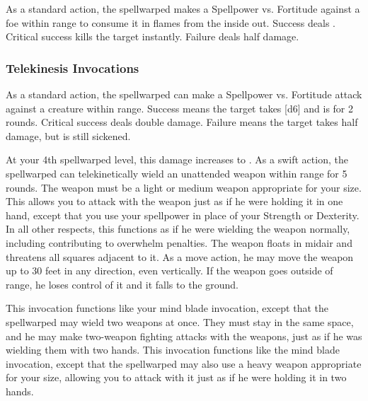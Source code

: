             As a standard action, the spellwarped makes a Spellpower vs. Fortitude against a foe within \rngclose range to consume it in flames from the inside out.
            Success deals .
            Critical success kills the target instantly.
            Failure deals half damage.

        \subsubsection{Telekinesis Invocations}
            As a standard action, the spellwarped can make a Spellpower vs. Fortitude attack against a creature within \rngclose range.
            Success means the target takes [d6] and is \sickened for 2 rounds.
            Critical success deals double damage.
            Failure means the target takes half damage, but is still sickened.
            \par At your 4th spellwarped level, this damage increases to .
            As a swift action, the spellwarped can telekinetically wield an unattended weapon within \rngclose range for 5 rounds.
            The weapon must be a light or medium weapon appropriate for your size.
            This allows you to attack with the weapon just as if he were holding it in one hand, except that you use your spellpower in place of your Strength or Dexterity.
            In all other respects, this functions as if he were wielding the weapon normally, including contributing to overwhelm penalties.
            The weapon floats in midair and threatens all squares adjacent to it.
            As a move action, he may move the weapon up to 30 feet in any direction, even vertically.
            If the weapon goes outside of \rngclose range, he loses control of it and it falls to the ground.

            This invocation functions like your mind blade invocation, except that the spellwarped may wield two weapons at once.
            They must stay in the same space, and he may make two-weapon fighting attacks with the weapons, just as if he was wielding them with two hands.
            This invocation functions like the mind blade invocation, except that the spellwarped may also use a heavy weapon appropriate for your size, allowing you to attack with it just as if he were holding it in two hands.

